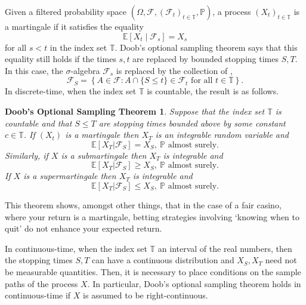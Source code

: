 \documentclass[12pt]{article}
\begin{document}

Given a filtered probability space $(\Omega,\mathcal{F},(\mathcal{F}_t)_{t\in\mathbb{T}},\mathbb{P})$, a process $(X_t)_{t\in\mathbb{T}}$ is a martingale if it satisfies the equality
\begin{equation*}
\mathbb{E}[X_t\mid\mathcal{F}_s]=X_s
\end{equation*}
for all $s<t$ in the index set $\mathbb{T}$. Doob's optional sampling theorem says that this equality still holds if the times $s,t$ are replaced by bounded stopping times $S,T$. In this case, the $\sigma$-algebra $\mathcal{F}_s$ is replaced by the collection of ,
\begin{equation*}
\mathcal{F}_S=\left\{A\in\mathcal{F}:A\cap\{S\le t\}\in\mathcal{F}_t\textrm{ for all }t\in\mathbb{T}\right\}.
\end{equation*}
In discrete-time, when the index set $\mathbb{T}$ is countable, the result is as follows.

\newtheorem*{thm}{Doob's Optional Sampling Theorem}
\begin{thm}
Suppose that the index set $\mathbb{T}$ is countable and that $S\le T$ are stopping times bounded above by some constant $c\in\mathbb{T}$.
If $(X_t)$ is a martingale then $X_T$ is an integrable random variable and
\begin{equation}
\mathbb{E}[X_T|\mathcal{F}_S] = X_S,\ \mathbb{P}\textrm{ almost surely}.
\end{equation}
Similarly, if $X$ is a submartingale then $X_T$ is integrable and
\begin{equation}
\mathbb{E}[X_T|\mathcal{F}_S] \ge X_S,\ \mathbb{P}\textrm{ almost surely}.
\end{equation}
If $X$ is a supermartingale then $X_T$ is integrable and
\begin{equation}
\mathbb{E}[X_T|\mathcal{F}_S] \le X_S,\ \mathbb{P}\textrm{ almost surely}.
\end{equation}
\end{thm}


This theorem shows, amongst other things, that in the case of a fair casino, where your return is a martingale, betting strategies involving `knowing when to quit' do not enhance your expected return.

In continuous-time, when the index set $\mathbb{T}$ an interval of the real numbers, then the stopping times $S,T$ can have a continuous distribution and $X_S,X_T$ need not be measurable quantities. Then, it is necessary to place conditions on the sample paths of the process $X$. In particular, Doob's optional sampling theorem holds in continuous-time if $X$ is assumed to be right-continuous.

\end{document}
